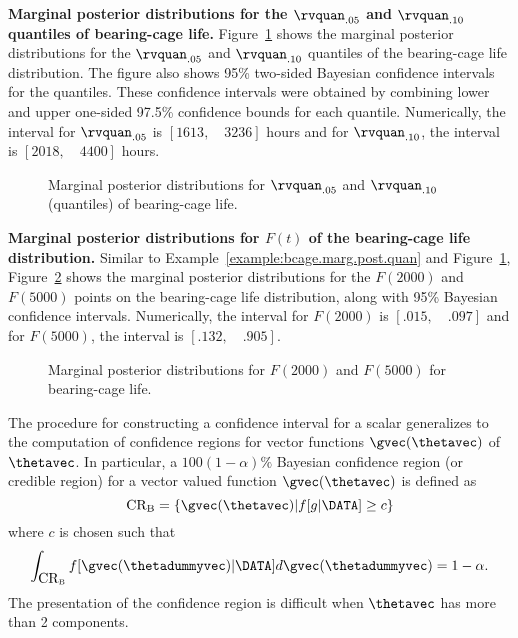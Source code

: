 \begin{example}
\label{example:bcage.marg.post.quan}
{\bf Marginal posterior distributions for the $\rvquan_{.05}$ and
$\rvquan_{.10}$ quantiles of bearing-cage life.}
Figure~\ref{figure:quantile.marginal.postx.bcage.ps} shows the
marginal posterior distributions for the $\rvquan_{.05}$ and
$\rvquan_{.10}$ quantiles of the bearing-cage life
distribution. The figure also shows 95\% two-sided Bayesian
confidence intervals for the quantiles. These confidence intervals
were obtained by combining lower and upper one-sided 97.5\% confidence
bounds for each quantile. Numerically, the interval for
$\rvquan_{.05}$
is $[1613, \quad 3236]$ hours and for $\rvquan_{.10}$, 
the interval is $[2018, \quad 4400]$ hours.
\begin{figure}
\caption{Marginal posterior
distributions for $\rvquan_{.05}$ and $\rvquan_{.10}$
(quantiles) of bearing-cage life.}
\label{figure:quantile.marginal.postx.bcage.ps}
\end{figure}
\end{example}

\begin{example}
{\bf Marginal posterior distributions for $F(t)$ of
the bearing-cage life distribution.} Similar to
Example~\ref{example:bcage.marg.post.quan} and
Figure~\ref{figure:quantile.marginal.postx.bcage.ps},
Figure~\ref{figure:failure.prob.marginal.postx.bcage.ps} shows the
marginal posterior distributions for the $F(2000)$ and $F(5000)$
points on the bearing-cage life distribution, along with 95\% Bayesian
confidence intervals. Numerically, the interval for $F(2000)$ is
$[.015, \quad .097]$ and for $F(5000)$, the interval is
$[.132,  \quad .905]$.
\begin{figure}
\caption{Marginal posterior
distributions for $F(2000)$ and $F(5000)$
for bearing-cage life.}
\label{figure:failure.prob.marginal.postx.bcage.ps}
\end{figure}
\end{example}

The procedure for constructing a confidence interval
for a scalar generalizes to the computation of confidence
regions for vector functions $\gvec(\thetavec)$
of $\thetavec$.  
In particular, a
$100(1-\alpha)\%$
Bayesian confidence region (or credible region)
for a vector valued function $\gvec(\thetavec)$ is defined as
\begin{displaymath}
\mbox{CR}_{\rm B}=
\left \{\gvec(\thetavec) | f[ g |\DATA] \ge c
 \right \}
\end{displaymath}
where $c$ is chosen such that 
\begin{displaymath}
\int_{\mbox{CR}_{\rm B}} 
f[\gvec(\thetadummyvec) | \DATA] d \gvec(\thetadummyvec)=1-\alpha.
\end{displaymath}
The presentation of the confidence region
is difficult when $\thetavec$ has more than 2 components.

